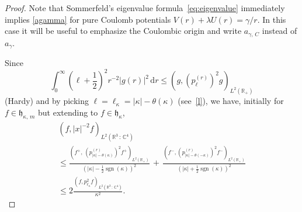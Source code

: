 \documentclass[AHL,Unicode,longabstracts,published]{cedram}
\DeclareMathOperator{\sgn}{sgn}
\newcommand*\dr{\mathrm{d}r}
\newcommand*\cz{\mathbb{C}}
\newcommand*\rz{\mathbb{R}}
\newcommand*\gh{\mathfrak{h}}
\begin{document}
\begin{proof}
Note that Sommerfeld's eigenvalue formula~\eqref{eq:eigenvalue} immediately implies \eqref{agamma} for pure Coulomb potentials $V(r)+\lambda U(r)=\gamma/r$. In this case it will be useful to emphasize the Coulombic origin and write $a_{\gamma,\,C}$ instead of $a_\gamma$.

Since
\[
\int_0^\infty\left(\ell+\frac12\right)^2r^{-2}|g(r)|^2\,\dr \leq \left(g,\left(p_\ell^{(r)}\right)^2g\right)_{L^2\left(\rz_+\right)}
\]
(Hardy) and by picking $\ell=\ell_\kappa=|\kappa|-\theta(\kappa)$ (see~\eqref{l}), we have, initially for $f\in\gh_{\kappa,\,m}$ but extending to $f\in\gh_\kappa$,
\begin{multline}\label{eq:hardyang}
\left(f,|x|^{-2}f\right)_{L^2\left(\rz^3\,:\,\cz^4\right)}\\
\leq \frac{\left(f^+,\,\left(p_{|\kappa|-\theta(\kappa)}^{(r)}\right)^2f^+\right)_{L^2\left(\rz_+\right)}
}{\left(|\kappa|-\frac12\sgn(\kappa)\right)^2}\,+ \,\frac{\left(f^-,\left(p_{|\kappa|-\theta(-\kappa)}^{(r)}\right)^2f^-\right)_{L^2\left(\rz_+\right)}}{\left(|\kappa|+\frac12\sgn(\kappa)\right)^2}\\
\leq 2\frac{\left(f,p_{\ell_\kappa}^2 f\right)_{L^2\left(\rz^3\,:\,\cz^4\right)}}{
\kappa^2}.
\end{multline}



\end{proof}
\end{document}
